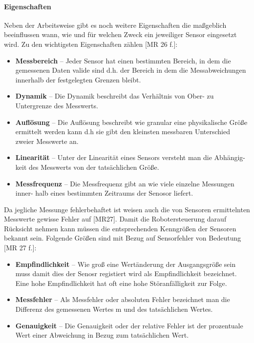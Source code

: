 \paragraph{Eigenschaften}
\color{finishing}
Neben der Arbeitsweise gibt es noch weitere Eigenschaften die maßgeblich beeinflussen wann, wie und für welchen Zweck ein jeweiliger Sensor eingesetzt wird. Zu den wichtigsten Eigenschaften zählen [MR 26 f.]:
\begin{itemize}
	\item{\textbf{Messbereich}} -- Jeder Sensor hat einen bestimmten Bereich, in dem die 	gemessenen Daten valide sind d.h. der Bereich in dem die Messabweichungen innerhalb der festgelegten Grenzen bleibt.
	\item{\textbf{Dynamik}} -- Die Dynamik beschreibt das Verhältnis von Ober- zu Untergrenze des Messwerts.
	\item{\textbf{Auflösung}} -- Die Auflösung beschreibt wie granular eine physikalische Größe ermittelt werden kann d.h sie gibt den kleinsten messbaren Unterschied zweier Messwerte an.
	\item{\textbf{Linearität}} -- Unter der Linearität eines Sensors versteht man die Abhängig-
	keit des Messwerts von der tatsächlichen Größe.
	\item{\textbf{Messfrequenz}} -- Die Messfrequenz gibt an wie viele einzelne Messungen inner-
	halb eines bestimmten Zeitraums der Senosor liefert.
\end{itemize}
Da jegliche Messunge fehlerbehaftet ist weisen auch die von Sensoren ermittelnten Messwerte gewisse Fehler auf [MR27]. 
\newline
Damit die Robotersteuerung darauf Rücksicht nehmen kann müssen die entsprechenden Kenngrößen der Sensoren bekannt sein. Folgende Größen sind mit Bezug auf Sensorfehler von Bedeutung [MR 27 f.]:
\begin{itemize}
	\item{\textbf{Empfindlichkeit}} -- Wie groß eine Wertänderung der Ausgangsgröße sein muss damit dies der Senosr registiert wird als Empfindlichkeit bezeichnet. Eine hohe Empfindlichkeit hat oft eine hohe Störanfälligkeit zur Folge.
	\item{\textbf{Messfehler}} -- Als Messfehler oder absoluten Fehler bezeichnet man die Differenz des gemessenen Wertes m und des tatsächlichen Wertes.
	\item{\textbf{Genauigkeit}} -- Die Genauigkeit oder der relative Fehler ist der prozentuale
	Wert einer Abweichung in Bezug zum tatsächlichen Wert.
\end{itemize}
